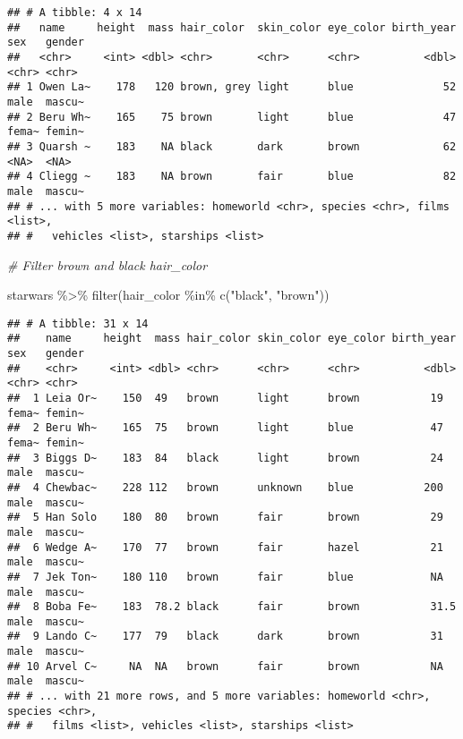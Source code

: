 \documentclass[
]{book}
\newenvironment{Shaded}{\begin{snugshade}}{\end{snugshade}}
\newcommand{\CommentTok}[1]{\textcolor[rgb]{0.56,0.35,0.01}{\textit{#1}}}
\newcommand{\FunctionTok}[1]{\textcolor[rgb]{0.00,0.00,0.00}{#1}}
\newcommand{\NormalTok}[1]{#1}
\newcommand{\SpecialCharTok}[1]{\textcolor[rgb]{0.00,0.00,0.00}{#1}}
\newcommand{\StringTok}[1]{\textcolor[rgb]{0.31,0.60,0.02}{#1}}
\begin{document}
\begin{verbatim}
## # A tibble: 4 x 14
##   name     height  mass hair_color  skin_color eye_color birth_year sex   gender
##   <chr>     <int> <dbl> <chr>       <chr>      <chr>          <dbl> <chr> <chr> 
## 1 Owen La~    178   120 brown, grey light      blue              52 male  mascu~
## 2 Beru Wh~    165    75 brown       light      blue              47 fema~ femin~
## 3 Quarsh ~    183    NA black       dark       brown             62 <NA>  <NA>  
## 4 Cliegg ~    183    NA brown       fair       blue              82 male  mascu~
## # ... with 5 more variables: homeworld <chr>, species <chr>, films <list>,
## #   vehicles <list>, starships <list>
\end{verbatim}

\begin{Shaded}
\begin{Highlighting}[]
\CommentTok{\# Filter brown and black hair\_color}

\NormalTok{starwars }\SpecialCharTok{\%\textgreater{}\%}
  \FunctionTok{filter}\NormalTok{(hair\_color }\SpecialCharTok{\%in\%} \FunctionTok{c}\NormalTok{(}\StringTok{"black"}\NormalTok{, }\StringTok{"brown"}\NormalTok{))}
\end{Highlighting}
\end{Shaded}

\begin{verbatim}
## # A tibble: 31 x 14
##    name     height  mass hair_color skin_color eye_color birth_year sex   gender
##    <chr>     <int> <dbl> <chr>      <chr>      <chr>          <dbl> <chr> <chr> 
##  1 Leia Or~    150  49   brown      light      brown           19   fema~ femin~
##  2 Beru Wh~    165  75   brown      light      blue            47   fema~ femin~
##  3 Biggs D~    183  84   black      light      brown           24   male  mascu~
##  4 Chewbac~    228 112   brown      unknown    blue           200   male  mascu~
##  5 Han Solo    180  80   brown      fair       brown           29   male  mascu~
##  6 Wedge A~    170  77   brown      fair       hazel           21   male  mascu~
##  7 Jek Ton~    180 110   brown      fair       blue            NA   male  mascu~
##  8 Boba Fe~    183  78.2 black      fair       brown           31.5 male  mascu~
##  9 Lando C~    177  79   black      dark       brown           31   male  mascu~
## 10 Arvel C~     NA  NA   brown      fair       brown           NA   male  mascu~
## # ... with 21 more rows, and 5 more variables: homeworld <chr>, species <chr>,
## #   films <list>, vehicles <list>, starships <list>
\end{verbatim}
\end{document}
